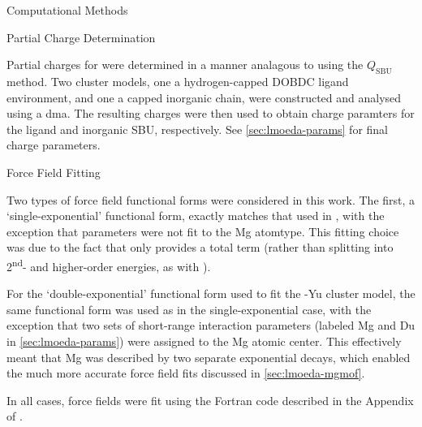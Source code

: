 \begin{section}{Computational Methods}
\label{sec:lmoeda-methods}

\begin{subsection}{Partial Charge Determination}

Partial charges for \mgmof were determined in a manner analagous to
 using the $Q_{\text{SBU}}$ method. Two cluster models, one
a hydrogen-capped DOBDC ligand environment, and one a capped  inorganic chain,
were constructed and analysed using a \acrfull{dma}. The resulting \dma charges were
then used to obtain charge paramters for the ligand and inorganic SBU,
respectively. See \cref{sec:lmoeda-params} for final charge parameters.

\end{subsection}
\begin{subsection}{Force Field Fitting}

Two types of force field functional forms were considered in this work. The
first, a `single-exponential' functional form, exactly matches that used in
, with the exception that \dhf parameters were not fit to
the Mg atomtype. This fitting choice was due to the fact that \lmoeda only provides a
total \induction term (rather than splitting into 2\textsuperscript{nd}- and
higher-order \induction energies, as with \sapt). 

For the `double-exponential' functional form used to fit the \mgmof-Yu cluster
model, the same functional form was used as in the single-exponential case,
with the exception that two sets of short-range interaction parameters
(labeled Mg and Du in \cref{sec:lmoeda-params}) were assigned to the Mg atomic center. This
effectively meant that Mg was described by two separate exponential decays,
which enabled the much more accurate force field fits discussed in
\cref{sec:lmoeda-mgmof}.

In all cases, force fields were fit using the Fortran code described in the
Appendix of .


\end{subsection}




\end{section}

